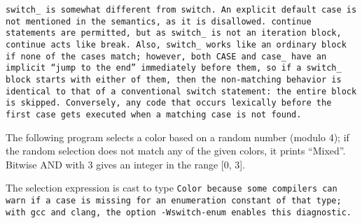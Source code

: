 \note \tt{switch_} is somewhat different from \tt{switch}.
An explicit \tt{default} case is not mentioned in the semantics,
as it is disallowed.
\tt{continue} statements are permitted, but as \tt{switch_}
is not an iteration block, \tt{continue} acts like \tt{break}.
Also, \tt{switch_} works like an ordinary block if none of the cases match;
however, both \tt{CASE} and \tt{case_} have an implicit ``jump to the end''
immediately before them, so if a \tt{switch_} block starts with either of them,
then the non-matching behavior is identical to that of a
conventional \tt{switch} statement: the entire block is skipped.
Conversely, any code that occurs lexically before the
first case gets executed when a matching case is not found.

\example The following program selects a color based on
a random number (modulo 4); if the random selection does
not match any of the given colors, it prints ``Mixed''.
Bitwise AND with 3 gives an integer in the range [0, 3].


\note The selection expression is cast to type \tt{Color}
because some compilers can warn if a case is missing for an
enumeration constant of that type; with \tt{gcc} and \tt{clang},
the option \tt{-Wswitch-enum} enables this diagnostic.


